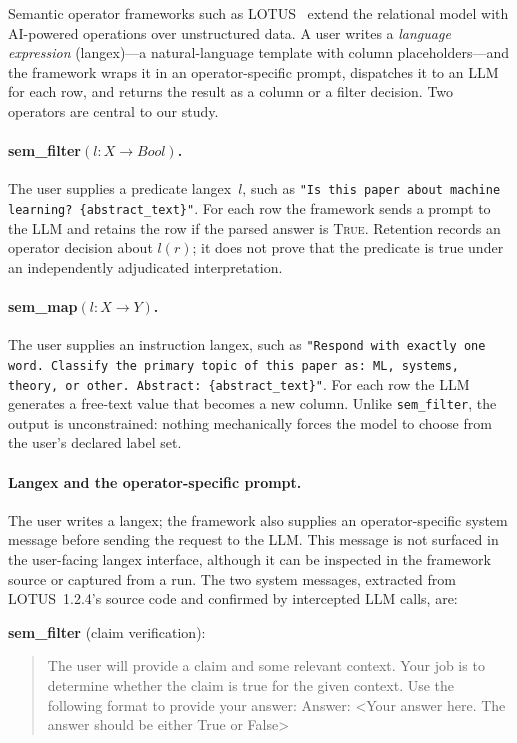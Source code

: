 \documentclass[11pt]{article}
\begin{document}
Semantic operator frameworks such as LOTUS~\cite{lotus} extend the
relational model with AI-powered operations over unstructured data.
A user writes a \emph{language expression} (langex)---a natural-language
template with column placeholders---and the framework wraps it in an
operator-specific prompt, dispatches it to an LLM for each row, and returns
the result as a column or a filter decision.
Two operators are central to our study.

\paragraph{sem\_filter$(l\colon X \to \mathit{Bool})$.}
The user supplies a predicate langex~$l$, such as
\texttt{"Is this paper about machine learning? \{abstract\_text\}"}.
For each row the framework sends a prompt to the LLM and retains
the row if the parsed answer is \textsc{True}. Retention records an
operator decision about $l(r)$; it does not prove that the predicate is
true under an independently adjudicated interpretation.

\paragraph{sem\_map$(l\colon X \to Y)$.}
The user supplies an instruction langex, such as
\texttt{"Respond with exactly one word. Classify the primary topic of
this paper as: ML, systems, theory, or other. Abstract: \{abstract\_text\}"}.
For each row the LLM generates a free-text value that becomes a new column.
Unlike \texttt{sem\_filter}, the output is unconstrained:
nothing mechanically forces the model to choose from the user's declared
label set.

\paragraph{Langex and the operator-specific prompt.}
The user writes a langex; the framework also supplies an operator-specific
system message before sending the request to the LLM.  This message is not
surfaced in the user-facing langex interface, although it can be inspected in
the framework source or captured from a run.  The two system messages,
extracted from LOTUS~1.2.4's source code and confirmed by intercepted LLM
calls, are:

\smallskip
\noindent\textbf{sem\_filter} (claim verification):
\begin{quote}\small\ttfamily\raggedright
The user will provide a claim and some relevant context.
Your job is to determine whether the claim is true for the given context.
Use the following format to provide your answer:
Answer: <Your answer here. The answer should be either True or False>
\end{quote}
\end{document}
